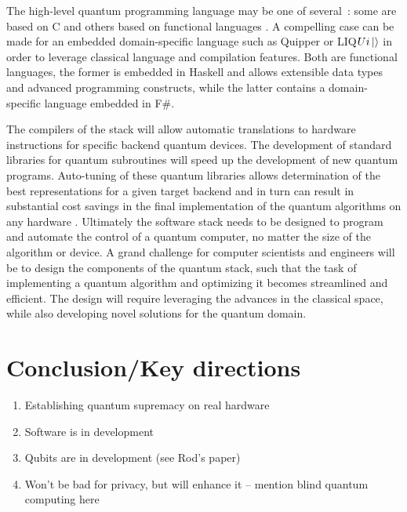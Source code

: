 \documentclass[journal]{IEEEtran}
\begin{document}
The high-level quantum programming language may be one of several~\cite{gay2006quantum}:
some are based on C \cite{omer1998procedural} and others based on functional languages \cite{green13,wecker14}.
A compelling case can be made for an embedded domain-specific language such as Quipper \cite{green13} or LIQ$Ui\ket{} $\cite{wecker14} in order to leverage classical language and compilation features.
Both are functional languages, the former is embedded in Haskell and allows extensible data types and advanced programming constructs,
while the latter contains a domain-specific language embedded in F\#.

The compilers of the stack will allow automatic translations to hardware instructions for specific backend quantum devices.  The development of standard libraries for quantum subroutines will speed up the development of new quantum programs.
Auto-tuning of these quantum libraries allows determination of the best representations for a given target backend and in turn can result in substantial cost savings in the final implementation of the quantum algorithms on any hardware  \cite{stack}.  Ultimately the software stack needs to be designed to program and automate the control of a quantum computer, no matter the size of the algorithm or device.
A grand challenge for computer scientists and engineers will be to design the components of the quantum stack, such that the task of implementing a quantum algorithm and optimizing it becomes streamlined and efficient. The design will require leveraging the advances in the classical space, while also developing novel solutions for the quantum domain.

\section{Conclusion/Key directions}
\begin{enumerate}
\item    Establishing quantum supremacy on real hardware
\item     Software is in development
\item     Qubits are in development (see Rod's paper)
\item     Won't be bad for privacy, but will enhance it -- mention blind quantum computing here
\end{enumerate}
\end{document}
